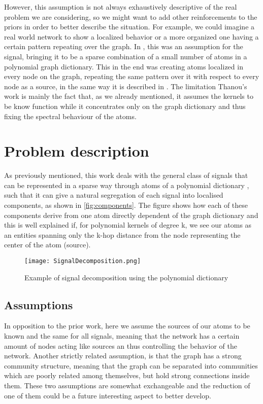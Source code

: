 However, this assumption is not always exhaustively descriptive of the real problem we are considering, so we might want to add other reinforcements to the priors in order to better describe the situation. For example, we could imagine a real world network to show a localized behavior or a more organized one having a certain pattern repeating over the graph. In \cite{Maretic2017}, this was an assumption for the signal, bringing it to be a sparse combination of a small number of atoms in a polynomial graph dictionary. This in the end was creating atoms localized in every node on the graph, repeating the same pattern over it with respect to every node as a source, in the same way it is described in \cite{Thanou2014}. The limitation Thanou's work is mainly the fact that, as we already mentioned, it assumes the kernels to be know function while it concentrates only on the graph dictionary and thus fixing the spectral behaviour of the atoms.

\section{Problem description}
As previously mentioned, this work deals with the general class of signals that can be represented in a sparse way through atoms of a polynomial dictionary \cite{Thanou2014}, such that it can give a natural segregation of each signal into localised components, as shown in \autoref{fig:components}. The figure shows how each of these components derive from one atom directly dependent of the graph dictionary and this is well explained if, for polynomial kernels of degree k, we see our atoms as an entities spanning only the k-hop distance from the node representing the center of the atom (source).

\begin{figure}
\centering
\texttt{[image: SignalDecomposition.png]}
\caption{Example of signal decomposition using the polynomial dictionary}
\label{fig:components}
\end{figure}

\subsection{Assumptions}
In opposition to the prior work, here we assume the sources of our atoms to be known and the same for all signals, meaning that the network has a certain amount of nodes acting like sources an thus controlling the behavior of the network. Another strictly related assumption, is that the graph has a strong community structure, meaning that the graph can be separated into communities which are poorly related among themselves, but hold strong connections inside them. These two assumptions are somewhat exchangeable and the reduction of one of them could be a future interesting aspect to better develop.

